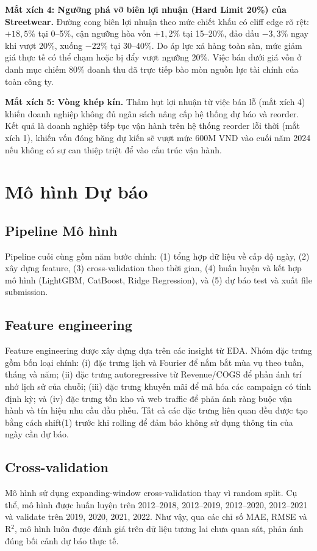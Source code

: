 \documentclass{article}
\begin{document}
\textbf{Mắt xích 4: Ngưỡng phá vỡ biên lợi nhuận (Hard Limit 20\%) của Streetwear.}
Đường cong biên lợi nhuận theo mức chiết khấu có
cliff edge rõ rệt: $+18,5\%$ tại 0--5\%, cận ngưỡng hòa vốn $+1,2\%$ tại 15--20\%,
đảo dấu $-3,3\%$ ngay khi vượt 20\%, xuống $-22\%$ tại 30--40\%. Do áp lực xả hàng toàn sàn, mức giảm giá thực tế có thể chạm hoặc bị đẩy vượt ngưỡng 20\%. Việc bán dưới giá vốn ở danh mục chiếm 80\% doanh thu đã trực tiếp bào mòn nguồn lực tài chính của toàn công ty.

\textbf{Mắt xích 5: Vòng khép kín.} Thâm hụt lợi nhuận từ việc bán lỗ (mắt xích 4) khiến doanh nghiệp không đủ ngân sách nâng cấp hệ thống dự báo và reorder. Kết quả là doanh nghiệp tiếp tục vận hành trên hệ thống reorder lỗi thời (mắt xích 1), khiến vốn đóng băng dự kiến sẽ vượt mức 600M VND vào cuối năm 2024 nếu không có sự can thiệp triệt để vào cấu trúc vận hành.

\section{Mô hình Dự báo}
\subsection{Pipeline Mô hình}
Pipeline cuối cùng gồm năm bước chính: (1) tổng hợp dữ liệu về cấp độ ngày, (2) xây dựng feature, (3) cross-validation theo thời gian, (4) huấn luyện và kết hợp mô hình (LightGBM, CatBoost, Ridge Regression), và (5) dự báo test và xuất file submission.
\subsection{Feature engineering}
Feature engineering được xây dựng dựa trên các insight từ EDA. Nhóm đặc trưng gồm bốn loại chính: (i) đặc trưng lịch và Fourier để nắm bắt mùa vụ theo tuần, tháng và năm; (ii) đặc trưng autoregressive từ Revenue/COGS để phản ánh trí nhớ lịch sử của chuỗi; (iii) đặc trưng khuyến mãi để mã hóa các campaign có tính định kỳ; và (iv) đặc trưng tồn kho và web traffic để phản ánh ràng buộc vận hành và tín hiệu nhu cầu đầu phễu. Tất cả các đặc trưng liên quan đều được tạo bằng cách shift(1) trước khi rolling để đảm bảo không sử dụng thông tin của ngày cần dự báo.
\subsection{Cross-validation}
Mô hình sử dụng expanding-window cross-validation thay vì random split. Cụ thể, mô hình được huấn luyện trên 2012--2018, 2012--2019, 2012--2020, 2012--2021 và validate trên 2019, 2020, 2021, 2022. Như vậy, qua các chỉ số MAE, RMSE và R$^2$, mô hình luôn được đánh giá trên dữ liệu tương lai chưa quan sát, phản ánh đúng bối cảnh dự báo thực tế.
\end{document}
